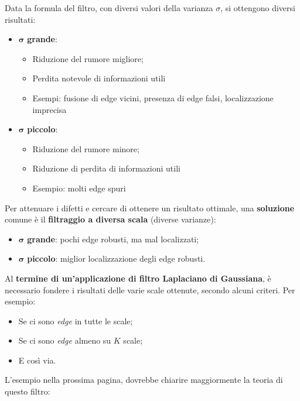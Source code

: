 \documentclass[a4paper]{article}
\begin{document}
	\noindent
	Data la formula del filtro, con diversi valori della varianza $\sigma$, si ottengono diversi risultati:
	\begin{itemize}
		\item $\boldsymbol{\sigma}$ \textbf{grande}:
		\begin{itemize}
			\item[\ding{51}] Riduzione del rumore migliore;
			\item[\ding{55}] Perdita notevole di informazioni utili
			\item[\ding{61}] Esempi: fusione di edge vicini, presenza di edge falsi, localizzazione imprecisa
		\end{itemize}
	
		\item $\boldsymbol{\sigma}$ \textbf{piccolo}:
		\begin{itemize}
			\item[\ding{51}] Riduzione del rumore minore;
			\item[\ding{55}] Riduzione di perdita di informazioni utili
			\item[\ding{61}] Esempio: molti edge spuri
		\end{itemize}
	\end{itemize}
	Per attenuare i difetti e cercare di ottenere un risultato ottimale, una \textbf{soluzione} comune è il \textbf{filtraggio a diversa scala} (diverse varianze):
	\begin{itemize}
		\item $\boldsymbol{\sigma}$ \textbf{grande}: pochi edge robusti, ma mal localizzati;
		\item $\boldsymbol{\sigma}$ \textbf{piccolo}: miglior localizzazione degli edge robusti.
	\end{itemize}
	Al \textbf{termine di un'applicazione di filtro Laplaciano di Gaussiana}, è necessario fondere i risultati delle varie scale ottenute, secondo alcuni criteri. Per esempio:
	\begin{itemize}
		\item Se ci sono \emph{edge} in tutte le scale;
		\item Se ci sono \emph{edge} almeno su $K$ scale;
		\item E così via.
	\end{itemize}
	L'esempio nella prossima pagina, dovrebbe chiarire maggiormente la teoria di questo filtro:
\end{document}
